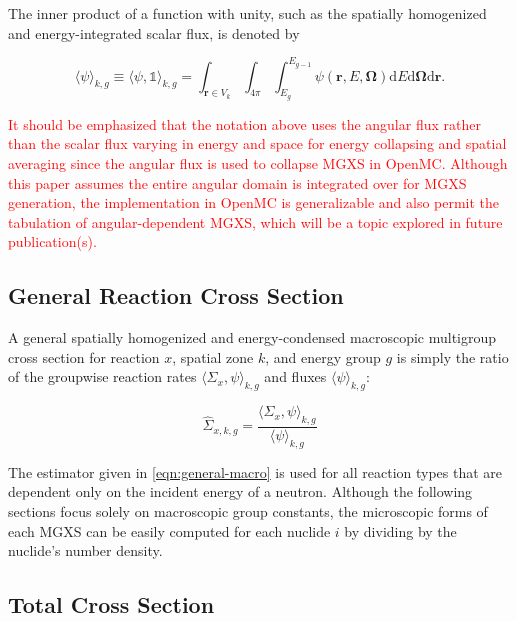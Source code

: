 \noindent The inner product of a function with unity, such as the spatially homogenized and energy-integrated scalar flux, is denoted by

\begin{equation}
\label{eqn:angle-flux}
\langle \psi \rangle_{k,g} \equiv \langle \psi, \mathbb{1} \rangle_{k,g} = \int_{\mathbf{r} \in V_{k}} \int_{4\pi} \int_{E_{g}}^{E_{g-1}} \psi(\mathbf{r},E,\mathbf{\Omega}) \mathrm{d}E\mathrm{d}\mathbf{\Omega}\mathrm{d}\mathbf{r}.
\end{equation}

\textcolor{red}{It should be emphasized that the notation above uses the angular flux rather than the scalar flux varying in energy and space for energy collapsing and spatial averaging since the angular flux is used to collapse MGXS in OpenMC. Although this paper assumes the entire angular domain is integrated over for MGXS generation, the implementation in OpenMC is generalizable and also permit the tabulation of angular-dependent MGXS, which will be a topic explored in future publication(s).}

\subsection{General Reaction Cross Section}
\label{subsubsec:tally-types-gen-xs}

A general spatially homogenized and energy-condensed macroscopic multigroup cross section for reaction $x$, spatial zone $k$, and energy group $g$ is simply the ratio of the groupwise reaction rates $\langle \Sigma_{x}, \psi \rangle_{k,g}$ and fluxes $\langle \psi \rangle_{k,g}$:

\begin{equation}
\label{eqn:general-macro}
\hat{\Sigma}_{x,k,g} = \frac{\langle \Sigma_{x}, \psi \rangle_{k,g}}{\langle \psi \rangle_{k,g}}
\end{equation}

\noindent The estimator given in \cref{eqn:general-macro} is used for all reaction types that are dependent only on the incident energy of a neutron. Although the following sections focus solely on macroscopic group constants, the microscopic forms of each MGXS can be easily computed for each nuclide $i$ by dividing by the nuclide's number density.

\subsection{Total Cross Section}
\label{subsubsec:tally-types-tot-xs}

